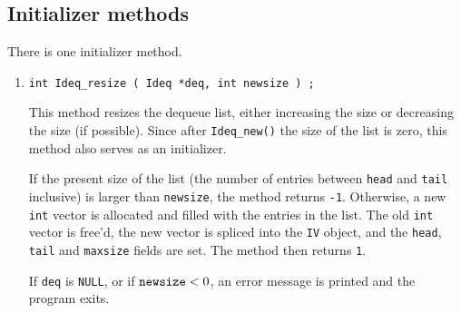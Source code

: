\subsection{Initializer methods}
\label{subsection:Ideq:proto:initializers}
\par
There is one initializer method.
\par
\begin{enumerate}
\item
\begin{verbatim}
int Ideq_resize ( Ideq *deq, int newsize ) ;
\end{verbatim}
This method resizes the dequeue list, either increasing the size
or decreasing the size (if possible).
Since after {\tt Ideq\_new()} the size of the list is zero,
this method also serves as an initializer.
\par
If the present size of the list (the number of entries between 
{\tt head} and {\tt tail} inclusive) is larger than {\tt newsize},
the method returns {\tt -1}.
Otherwise, a new {\tt int} vector is allocated and filled with the
entries in the list.
The old {\tt int} vector is free'd, the new vector is spliced
into the {\tt IV} object, and the {\tt head}, {\tt tail} and
{\tt maxsize} fields are set.
The method then returns {\tt 1}.
\par {}
If {\tt deq} is {\tt NULL},
or if ${\tt newsize} < 0$,
an error message is printed and the program exits.
\end{enumerate}
\par
